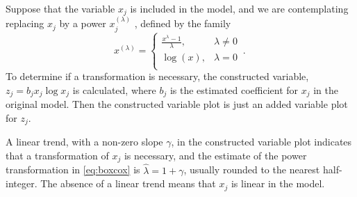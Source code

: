 Suppose that the variable $x_j$ is included in the model, and we are
contemplating replacing $x_j$  by a power $x_j^{(\lambda)}$ , defined by
the family \citep{BoxCox:64}
\begin{equation}\label{eq:boxcox}
x ^{(\lambda)} = \left\{
\begin{array}{cl}
\frac{x^\lambda - 1}{\lambda}, & \lambda \ne 0 \\
\log (x),  & \lambda = 0 \\
\end{array}
\right. \period
\end{equation}
To determine if a transformation is necessary, the constructed variable,
$z_j = b_j x_j \log x_j$ is calculated, where
$b_j$ is the estimated coefficient for $x_j$ in the original model.
Then the constructed variable plot is just an added variable plot for
$z_j$.

A linear trend, with a non-zero slope $\gamma$, in the constructed variable
plot indicates that a transformation of $x_j$ is necessary,
and the estimate of the power transformation in \eqref{eq:boxcox} is
$\hat{\lambda} = 1 + \gamma$, usually rounded to the nearest half-integer.
The absence of a linear trend means that $x_j$ is linear in the model.

